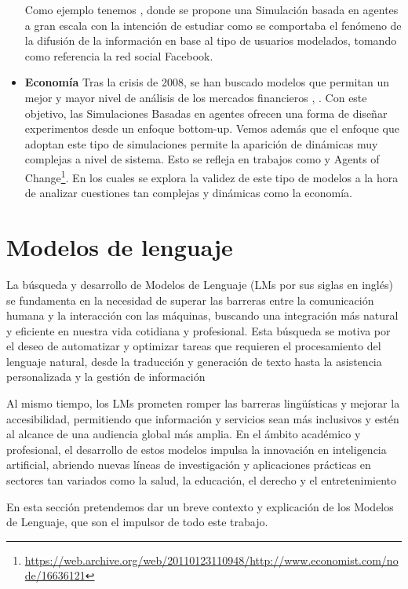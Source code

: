 \begin{itemize}
Como ejemplo tenemos \cite{nasrinpour2016agent}, donde se propone una Simulación  basada en agentes a gran escala con la intención de estudiar como se comportaba el fenómeno de la difusión de la información en base al tipo de usuarios modelados, tomando como referencia la red social Facebook.
	\item \textbf{Economía} Tras la crisis de 2008, se han buscado modelos que permitan un mejor y mayor nivel de análisis de los mercados financieros \cite {bookstaber2017end}, \cite{farmer2009economy}. Con este objetivo, las Simulaciones Basadas en agentes ofrecen una forma de diseñar experimentos desde un enfoque bottom-up. Vemos además que el enfoque que adoptan este tipo de simulaciones permite la aparición de dinámicas muy complejas a nivel de sistema. Esto se refleja en trabajos como \cite{tesfatsion2006handbook} y Agents of Change\footnote{\url{https://web.archive.org/web/20110123110948/http://www.economist.com/node/16636121}}. En los cuales se explora la validez de este tipo de modelos a la hora de analizar cuestiones tan complejas y dinámicas como la economía.
\end{itemize}

\section{Modelos de lenguaje}

La búsqueda y desarrollo de Modelos de Lenguaje (LMs por sus siglas en inglés) se fundamenta en la necesidad de superar las barreras entre la comunicación humana y la interacción con las máquinas, buscando una integración más natural y eficiente en nuestra vida cotidiana y profesional.  Esta búsqueda se motiva por el deseo de automatizar y optimizar tareas que requieren el procesamiento del lenguaje natural, desde la traducción y generación de texto hasta la asistencia personalizada y la gestión de información

Al mismo tiempo, los LMs prometen romper las barreras lingüísticas y mejorar la accesibilidad, permitiendo que información y servicios sean más inclusivos y estén al alcance de una audiencia global más amplia. En el ámbito académico y profesional, el desarrollo de estos modelos impulsa la innovación en inteligencia artificial, abriendo nuevas líneas de investigación y aplicaciones prácticas en sectores tan variados como la salud, la educación, el derecho y el entretenimiento

En esta sección pretendemos dar un breve contexto y explicación de los Modelos de Lenguaje, que son el impulsor de todo este trabajo.

